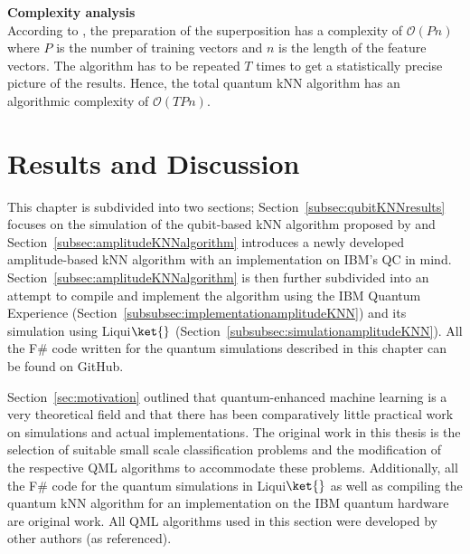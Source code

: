 \vspace{1cm}
\begin{greenbox}
\textbf{Complexity analysis}\\
\newline
According to , the preparation of the superposition has a complexity of $\mathcal{O}(Pn)$ where $P$ is the number of training vectors and $n$ is the length of the feature vectors. The algorithm has to be repeated $T$ times to get a statistically precise picture of the results. Hence, the total quantum kNN algorithm has an algorithmic complexity of $\mathcal{O}(TPn)$. 
\end{greenbox}

\chapter{Results and Discussion}\label{sec:resultsanddiscussion}

This chapter is subdivided into two sections; Section~\ref{subsec:qubitKNNresults} focuses on the simulation of the qubit-based kNN algorithm proposed by  and Section~\ref{subsec:amplitudeKNNalgorithm} introduces a newly developed amplitude-based kNN algorithm with an implementation on IBM's QC in mind. Section~\ref{subsec:amplitudeKNNalgorithm} is then further subdivided into an attempt to compile and implement the algorithm using the IBM Quantum Experience (Section~\ref{subsubsec:implementationamplitudeKNN}) and its simulation using Liqui$\ket{}$ (Section~\ref{subsubsec:simulationamplitudeKNN}). All the F\# code written for the quantum simulations described in this chapter can be found on GitHub.\footnotemark[13] 

Section~\ref{sec:motivation} outlined that quantum-enhanced machine learning is a very theoretical field and that there has been comparatively little practical work on simulations and actual implementations. The original work in this thesis is the selection of suitable small scale classification problems and the modification of the respective QML algorithms to accommodate these problems. Additionally, all the F\# code for the quantum simulations in Liqui$\ket{}$ as well as compiling the quantum kNN algorithm for an implementation on the IBM quantum hardware are original work. All QML algorithms used in this section were developed by other authors (as referenced).


